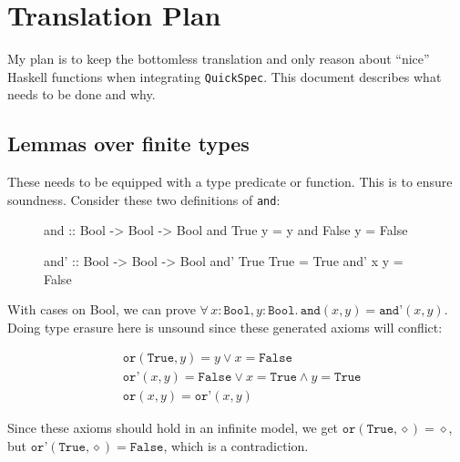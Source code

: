 \documentclass{article}
\newcommand\hs[1]{\texttt{#1}}
\newcommand\faa[2]{\forall \, #1 , #2 . \,}
\begin{document}
\section*{Translation Plan}

My plan is to keep the bottomless translation and only reason about
``nice'' Haskell functions when integrating \hs{QuickSpec}. This
document describes what needs to be done and why.

\subsection*{Lemmas over finite types}

These needs to be equipped with a type predicate or function. This is
to ensure soundness. Consider these two definitions of \hs{and}:

\begin{figure}[h!]
\centering
\begin{minipage}[b]{5cm}
\begin{code}
and :: Bool -> Bool -> Bool
and True  y = y
and False y = False
\end{code}
\end{minipage}
\hspace{10pt}
\begin{minipage}[b]{5cm}
\begin{code}
and' :: Bool -> Bool -> Bool
and' True True = True
and' x    y    = False
\end{code}
\end{minipage}
\end{figure}

\noindent
With cases on Bool, we can prove $\faa{x : \hs{Bool}}{y :
  \hs{Bool}} \hs{and}(x,y) = \hs{and'}(x,y)$. Doing type erasure here
is unsound since these generated axioms will conflict:

\begin{align*}
& \hs{or}(\hs{True},y) = y   \vee x = \hs{False} \\
& \hs{or'}(x,y) = \hs{False} \vee x = \hs{True} \wedge y = \hs{True} \\
& \hs{or}(x,y) = \hs{or'}(x,y)
\end{align*}

\noindent
Since these axioms should hold in an infinite model, we get
$\hs{or}(\hs{True},\diamond) = \diamond$, but
$\hs{or'}(\hs{True},\diamond) = \hs{False}$, which is a contradiction.
\end{document}
